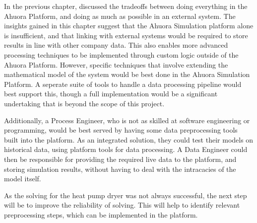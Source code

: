 In the previous chapter,  discussed the tradeoffs between doing everything in the Ahuora Platform, and doing as much as possible in an external system. The insights gained in this chapter suggest that the Ahuora Simulation platform alone is insufficient, and that linking with external systems would be required to store results in line with other company data. This also enables more advanced processing techniques to be implemented through custom logic outside of the Ahuora Platform. However, specific techniques that involve extending the mathematical model of the system would be best done in the Ahuora Simulation Platform. A seperate suite of tools to handle a data processing pipeline would best support this, though a full implementation would be a significant undertaking that is beyond the scope of this project. 

Additionally, a Process Engineer, who is not as skilled at software engineering or programming, would be best served by having some data preprocessing tools built into the platform. As an integrated solution, they could test their models on historical data, using platform tools for data processing. A Data Engineer could then be responsible for providing the required live data to the platform, and storing simulation results, without having to deal with the intracacies of the model itself.

As the solving for the heat pump dryer was not always successful, the next step will be to improve the reliability of solving. This will help to identify relevant preprocessing steps, which can be implemented in the platform.

